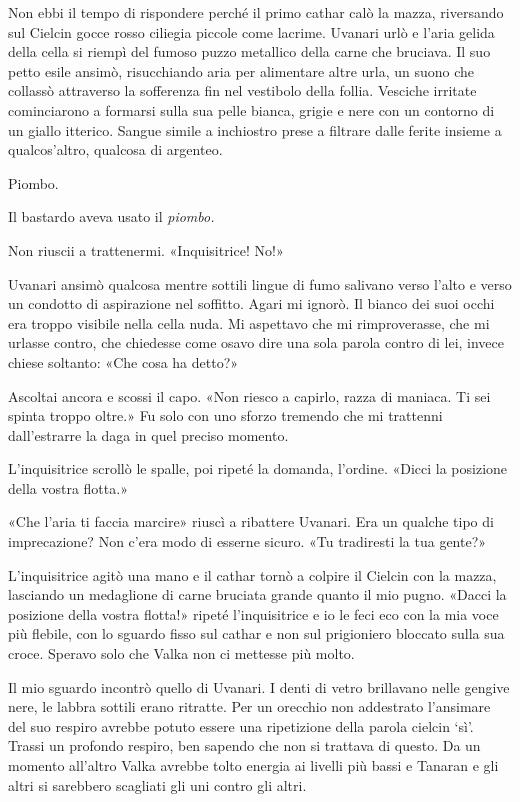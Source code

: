 Non ebbi il tempo di rispondere perché il primo cathar calò la mazza,
riversando sul Cielcin gocce rosso ciliegia piccole come lacrime.
Uvanari urlò e l'aria gelida della cella si riempì del fumoso puzzo
metallico della carne che bruciava. Il suo petto esile ansimò,
risucchiando aria per alimentare altre urla, un suono che collassò
attraverso la sofferenza fin nel vestibolo della follia. Vesciche
irritate cominciarono a formarsi sulla sua pelle bianca, grigie e nere
con un contorno di un giallo itterico. Sangue simile a inchiostro prese
a filtrare dalle ferite insieme a qualcos'altro, qualcosa di argenteo.

Piombo.

Il bastardo aveva usato il \emph{piombo.}

Non riuscii a trattenermi. «Inquisitrice! No!»

Uvanari ansimò qualcosa mentre sottili lingue di fumo salivano verso
l'alto e verso un condotto di aspirazione nel soffitto. Agari mi ignorò.
Il bianco dei suoi occhi era troppo visibile nella cella nuda. Mi
aspettavo che mi rimproverasse, che mi urlasse contro, che chiedesse
come osavo dire una sola parola contro di lei, invece chiese soltanto:
«Che cosa ha detto?»

Ascoltai ancora e scossi il capo. «Non riesco a capirlo, razza di
maniaca. Ti sei spinta troppo oltre.» Fu solo con uno sforzo tremendo
che mi trattenni dall'estrarre la daga in quel preciso momento.

L'inquisitrice scrollò le spalle, poi ripeté la domanda, l'ordine.
«Dicci la posizione della vostra flotta.»

«Che l'aria ti faccia marcire» riuscì a ribattere Uvanari. Era un
qualche tipo di imprecazione? Non c'era modo di esserne sicuro. «Tu
tradiresti la tua gente?»

L'inquisitrice agitò una mano e il cathar tornò a colpire il Cielcin con
la mazza, lasciando un medaglione di carne bruciata grande quanto il mio
pugno. «Dacci la posizione della vostra flotta!» ripeté l'inquisitrice e
io le feci eco con la mia voce più flebile, con lo sguardo fisso sul
cathar e non sul prigioniero bloccato sulla sua croce. Speravo solo che
Valka non ci mettesse più molto.

Il mio sguardo incontrò quello di Uvanari. I denti di vetro brillavano
nelle gengive nere, le labbra sottili erano ritratte. Per un orecchio
non addestrato l'ansimare del suo respiro avrebbe potuto essere una
ripetizione della parola cielcin `sì'. Trassi un profondo respiro, ben
sapendo che non si trattava di questo. Da un momento all'altro Valka
avrebbe tolto energia ai livelli più bassi e Tanaran e gli altri si
sarebbero scagliati gli uni contro gli altri.

